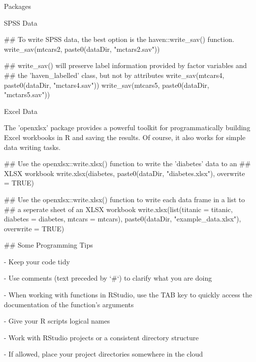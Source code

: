 \documentclass[10pt]{beamer}
\begin{document}
\begin{frame}{Packages}

\begin{frame}[fragile]{SPSS Data}

## To write SPSS data, the best option is the haven::write_sav() function.
write_sav(mtcars2, paste0(dataDir, "mctars2.sav"))

## write_sav() will preserve label information provided by factor variables and
## the 'haven_labelled' class, but not by attributes
write_sav(mtcars4, paste0(dataDir, "mctars4.sav"))
write_sav(mtcars5, paste0(dataDir, "mctars5.sav"))

\end{frame}


\begin{frame}[fragile]{Excel Data}

The 'openxlsx' package provides a powerful toolkit for programmatically
building Excel workbooks in R and saving the results. Of course, it also
works for simple data writing tasks.

## Use the openxlsx::write.xlsx() function to write the 'diabetes' data to an
## XLSX workbook
write.xlsx(diabetes, paste0(dataDir, "diabetes.xlsx"), overwrite = TRUE)

## Use the openxlsx::write.xlsx() function to write each data frame in a list to
## a seperate sheet of an XLSX workbook
write.xlsx(list(titanic = titanic, diabetes = diabetes, mtcars = mtcars),
           paste0(dataDir, "example_data.xlsx"),
           overwrite = TRUE)

         \end{frame}


## Some Programming Tips

- Keep your code tidy

- Use comments (text preceded by `#`) to clarify what you are doing

- When working with functions in RStudio, use the TAB key to quickly access the 
documentation of the function's arguments

- Give your R scripts logical names

- Work with RStudio projects or a consistent directory structure

- If allowed, place your project directories somewhere in the cloud


\end{frame}
\end{document}
